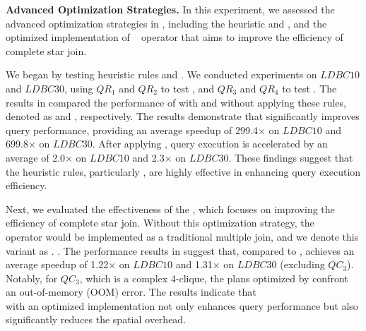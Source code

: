 \noindent\textbf{Advanced Optimization Strategies.}
In this experiment, we assessed the advanced optimization strategies in \name, including the heuristic \filterrule and \joinfuserule, and the optimized implementation of \expandintersect~ operator that aims to improve the efficiency of complete star join.

We began by testing heuristic rules \filterrule and \joinfuserule. %
We conducted experiments on $LDBC10$ and $LDBC30$, using $QR_1$ and $QR_2$ to test \filterrule, and $QR_3$ and $QR_4$ to test \joinfuserule. The results in  compared the performance of \name with and without applying these rules, denoted as \name and \relgonofi, respectively.
The results demonstrate that \filterrule significantly improves query performance, providing an average speedup of 299.4$\times$ on $LDBC10$ and 699.8$\times$ on $LDBC30$. After applying \joinfuserule, query execution is accelerated by an average of 2.0$\times$ on $LDBC10$ and 2.3$\times$ on $LDBC30$. These findings suggest that the heuristic rules, particularly \filterrule, are highly effective in enhancing query execution efficiency.


Next, we evaluated the effectiveness of the \expandintersect, which focuses on improving the efficiency of complete star join. Without this optimization strategy, the \expandintersect~ operator would be implemented as a traditional multiple join, and we denote this variant as \relgomj.
.
The performance results in  suggest that, compared to \relgomj, \name achieves an average speedup of 1.22$\times$ on $LDBC10$ and 1.31$\times$ on $LDBC30$ (excluding $QC_3$). Notably, for $QC_3$, which is a complex 4-clique, the plans optimized by \relgomj confront an out-of-memory (OOM) error. %
The results indicate that \expandintersect~\\ with an optimized implementation not only enhances query performance but also significantly reduces the spatial overhead.

